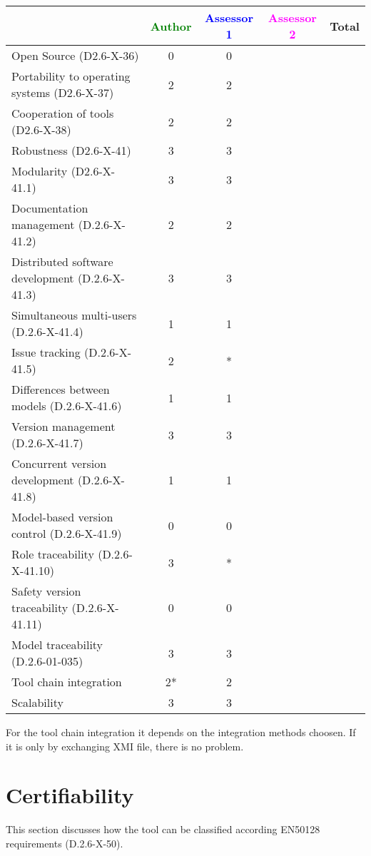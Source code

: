 \begin{tabular}{|l | c | c | c | c|}
\hline
& \textcolor{green}{Author} & \textcolor{blue}{Assessor 1} & \textcolor{magenta}{Assessor 2} & Total \\
\hline 
Open Source (D2.6-X-36) &0 & 0& &  \\
\hline 
Portability to operating systems (D2.6-X-37) &2 & 2& &  \\
\hline
Cooperation of tools (D2.6-X-38) &2 & 2& &  \\
\hline
Robustness (D2.6-X-41) &3 &3 & & \\
\hline
Modularity (D2.6-X-41.1) &3 &3 & & \\
\hline
Documentation management (D.2.6-X-41.2) & 2& 2& & \\
\hline
Distributed software development (D.2.6-X-41.3)  &3 & 3& & \\
\hline
Simultaneous multi-users (D.2.6-X-41.4)   &1 & 1& & \\
\hline
Issue tracking (D.2.6-X-41.5) &2 & *& & \\
\hline
Differences between models (D.2.6-X-41.6) &1 & 1& & \\
\hline
Version management (D.2.6-X-41.7) &3 & 3& & \\
\hline
Concurrent version development (D.2.6-X-41.8) &1 & 1& & \\
\hline
Model-based version control (D.2.6-X-41.9) &0 & 0& & \\
\hline
Role traceability (D.2.6-X-41.10) & 3& *& & \\
\hline
Safety version traceability (D.2.6-X-41.11) &0 &0 & & \\
\hline
Model traceability (D.2.6-01-035) &3 & 3& & \\
\hline
Tool chain integration &2* & 2& & \\
\hline
Scalability &3 & 3& & \\
\hline
\end{tabular}
\begin{author_comment}
For the tool chain integration it depends on the integration methods
choosen. If it is only by exchanging XMI file, there is no problem.
\end{author_comment}
\section{Certifiability}

This section discusses how the tool can be classified according EN50128 requirements (D.2.6-X-50).


